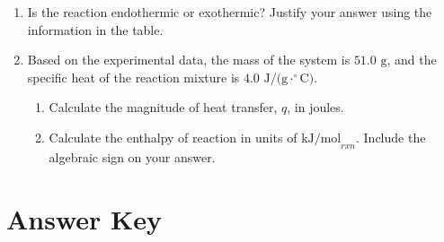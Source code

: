 \documentclass[12pt,letterpaper]{article}
\begin{document}
\begin{enumerate}
    \begin{enumerate}
        \item Is the reaction endothermic or exothermic? Justify your answer using the information in the table.
        
        \item Based on the experimental data, the mass of the system is $51.0\text{ g}$, and the specific heat of the reaction mixture is $4.0\text{ J/(g}\cdot^\circ\text{C)}$.
        \begin{enumerate}
            \item Calculate the magnitude of heat transfer, $q$, in joules.
            \item Calculate the enthalpy of reaction in units of $\text{kJ/mol}_{rxn}$. Include the algebraic sign on your answer.
        \end{enumerate}
    \end{enumerate}
\end{enumerate}
\pagebreak
\section*{Answer Key}
\end{document}
